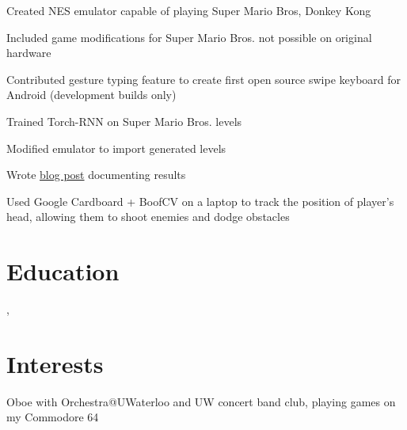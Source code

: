 \documentclass[12pt]{jmichaud-resume}
\begin{document}
 \hfill {}

\begin{minipage}[t]{0.49\textwidth} 

 \hfill
{}
\begin{tightemize}
	\item Created NES emulator capable of playing Super Mario Bros, Donkey Kong
	\item Included game modifications for Super Mario Bros. not possible on original hardware
\end{tightemize}
\sectionsep

\end{minipage} 
\hfill
\begin{minipage}[t]{0.49\textwidth}

 \hfill
{}
\begin{tightemize}
	\item Contributed gesture typing feature to create first open source swipe keyboard for Android (development builds only)
\end{tightemize}
\sectionsep

\end{minipage} 
\hfill
\begin{minipage}[t]{0.49\textwidth}

 \hfill
{}
\begin{tightemize}
	\item Trained Torch-RNN on Super Mario Bros. levels
	\item Modified emulator to import generated levels
	\item Wrote  \href{https://medium.com/@justin_michaud/super-mario-bros-level-generation-using-torch-rnn-726ddea7e9b7}{blog post} documenting results
\end{tightemize}
\sectionsep

\end{minipage} 
\hfill
\begin{minipage}[t]{0.49\textwidth}

 \hfill
{}
\begin{tightemize}
	\item Used Google Cardboard + BoofCV on a laptop to track the position of player’s head, allowing them to shoot enemies and dodge obstacles
\end{tightemize}
\sectionsep
\end{minipage}

\section{Education} 
,  \hfill {}

\section{Interests}
Oboe with Orchestra@UWaterloo and UW concert band club, playing games on my Commodore 64\\
\end{document}

